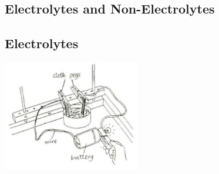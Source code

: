 \begin{multicols}{2}

\section*{Electrolytes and Non-Electrolytes}


\subsection{Electrolytes}

\begin{center}
\includegraphics[width=0.45\textwidth]{./img/source/electrolytes.jpg}
\end{center}


\end{multicols}
